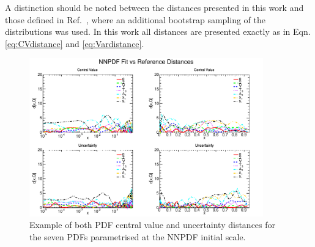 \documentclass[12pt,twoside,openright]{report}
\begin{document}
\begin{spacing}{1.5}
A distinction should be noted between the distances presented in this work and those defined in Ref.~\cite{Ball:2010de}, where an additional bootstrap sampling of the distributions was used. In this work all distances are presented exactly as in Eqn. \ref{eq:CVdistance} and \ref{eq:Vardistance}.

\begin{figure}[ht]
\centering
\includegraphics[width=0.9\textwidth]{7-PostLHC/figs/EVOLvs23BASIS/distances_evol.pdf}
\caption[Example plot of PDF distances.]{Example of both PDF central value and uncertainty distances for the seven PDFs parametrised at the NNPDF initial scale.}
\label{fig:distance example}
\end{figure}




\cleardoublepage
{}
\renewcommand{\bibname}{Publications}
\begin{thebibliography}{10}


\end{thebibliography}
\end{spacing}
\end{document}
